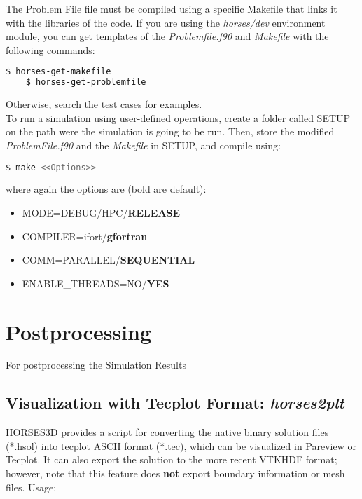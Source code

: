 \documentclass[a4paper,10pt]{report}
\begin{document}
The Problem File file must be compiled using a specific Makefile that links it with the libraries of the code. If you are using the \textit{horses/dev} environment module, you can get templates of the \textit{Problemfile.f90} and \textit{Makefile} with the following commands:

\begin{lstlisting}[language=bash]
	$ horses-get-makefile
	$ horses-get-problemfile
\end{lstlisting}

Otherwise, search the test cases for examples.\\

To run a simulation using user-defined operations, create a folder called SETUP on the path were the simulation is going to be run. Then, store the modified \textit{ProblemFile.f90} and the \textit{Makefile} in SETUP, and compile using:

\begin{lstlisting}[language=bash]
	$ make <<Options>>
\end{lstlisting}
where again the options are (bold are default):
\begin{itemize}
\item MODE=DEBUG/HPC/\textbf{RELEASE}
\item COMPILER=ifort/\textbf{gfortran}
\item COMM=PARALLEL/\textbf{SEQUENTIAL}
\item ENABLE\_THREADS=NO/\textbf{YES}
\end{itemize}


\chapter{Postprocessing}

For postprocessing the Simulation Results

\section{Visualization with Tecplot Format: \textit{horses2plt}}

HORSES3D provides a script for converting the native binary solution files (*.hsol) into tecplot ASCII format (*.tec), which can be visualized in Pareview or Tecplot. It can also export the solution to the more recent VTKHDF format; however, note that this feature does \textbf{not} export boundary information or mesh files. Usage:
\end{document}
